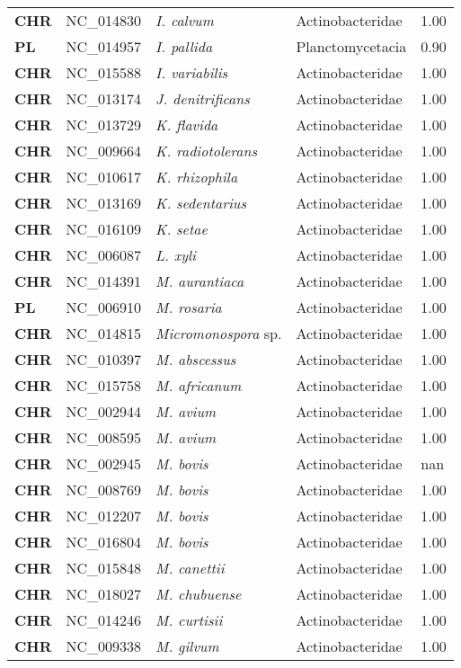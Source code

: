 \begin{adjustwidth}{-3cm}{2cm}
{\begin{supertabular}{>{\bfseries}l|p{0.1\textwidth}p{0.14\textwidth}l|l}
CHR & NC\_014830 & \textit{I. calvum} & Actinobacteridae & 1.00\\
PL & NC\_014957 & \textit{I. pallida} & Planctomycetacia & 0.90\\
CHR & NC\_015588 & \textit{I. variabilis} & Actinobacteridae & 1.00\\
CHR & NC\_013174 & \textit{J. denitrificans} & Actinobacteridae & 1.00\\
CHR & NC\_013729 & \textit{K. flavida} & Actinobacteridae & 1.00\\
CHR & NC\_009664 & \textit{K. radiotolerans} & Actinobacteridae & 1.00\\
CHR & NC\_010617 & \textit{K. rhizophila} & Actinobacteridae & 1.00\\
CHR & NC\_013169 & \textit{K. sedentarius} & Actinobacteridae & 1.00\\
CHR & NC\_016109 & \textit{K. setae} & Actinobacteridae & 1.00\\
CHR & NC\_006087 & \textit{L. xyli} & Actinobacteridae & 1.00\\
CHR & NC\_014391 & \textit{M. aurantiaca} & Actinobacteridae & 1.00\\
PL & NC\_006910 & \textit{M. rosaria} & Actinobacteridae & 1.00\\
CHR & NC\_014815 & \textit{Micromonospora} sp. & Actinobacteridae & 1.00\\
CHR & NC\_010397 & \textit{M. abscessus} & Actinobacteridae & 1.00\\
CHR & NC\_015758 & \textit{M. africanum} & Actinobacteridae & 1.00\\
CHR & NC\_002944 & \textit{M. avium} & Actinobacteridae & 1.00\\
CHR & NC\_008595 & \textit{M. avium} & Actinobacteridae & 1.00\\
CHR & NC\_002945 & \textit{M. bovis} & Actinobacteridae & nan\\
CHR & NC\_008769 & \textit{M. bovis} & Actinobacteridae & 1.00\\
CHR & NC\_012207 & \textit{M. bovis} & Actinobacteridae & 1.00\\
CHR & NC\_016804 & \textit{M. bovis} & Actinobacteridae & 1.00\\
CHR & NC\_015848 & \textit{M. canettii} & Actinobacteridae & 1.00\\
CHR & NC\_018027 & \textit{M. chubuense} & Actinobacteridae & 1.00\\
CHR & NC\_014246 & \textit{M. curtisii} & Actinobacteridae & 1.00\\
CHR & NC\_009338 & \textit{M. gilvum} & Actinobacteridae & 1.00\\

\end{supertabular}}
\end{adjustwidth}
